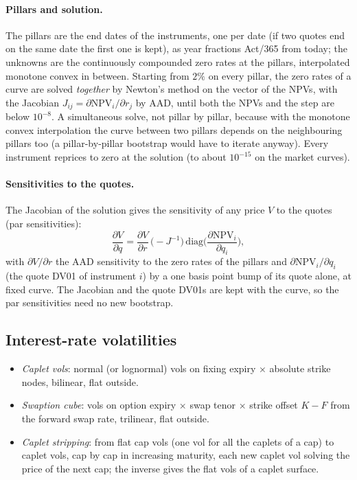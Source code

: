 \paragraph{Pillars and solution.} The pillars are the end dates of the instruments, one per date (if two quotes end on
the same date the first one is kept), as year fractions Act/365 from today; the unknowns are the continuously
compounded zero rates at the pillars, interpolated monotone convex in between. Starting from $2\%$ on every pillar,
the zero rates of a curve are solved \emph{together} by Newton's method on the vector of the NPVs, with the Jacobian
$J_{ij} = \partial \mathrm{NPV}_i/\partial r_j$ by AAD, until both the NPVs and the step are below $10^{-8}$. A simultaneous
solve, not pillar by pillar, because with the monotone convex interpolation the curve between two pillars depends on
the neighbouring pillars too (a pillar-by-pillar bootstrap would have to iterate anyway). Every instrument reprices to
zero at the solution (to about $10^{-15}$ on the market curves).

\paragraph{Sensitivities to the quotes.} The Jacobian of the solution gives the sensitivity of any price $V$ to the
quotes (par sensitivities):
\[
  \frac{\partial V}{\partial q} = \frac{\partial V}{\partial r}\,\big(-J^{-1}\big)\,
  \mathrm{diag}\Big(\frac{\partial \mathrm{NPV}_i}{\partial q_i}\Big),
\]
with $\partial V/\partial r$ the AAD sensitivity to the zero rates of the pillars and $\partial \mathrm{NPV}_i/\partial q_i$
(the quote DV01 of instrument $i$) by a one basis point bump of its quote alone, at fixed curve. The Jacobian and the
quote DV01s are kept with the curve, so the par sensitivities need no new bootstrap.

\subsection{Interest-rate volatilities}\label{sec:mp-ir-vols}
\begin{itemize}[nosep]
  \item \emph{Caplet vols}: normal (or lognormal) vols on fixing expiry $\times$ absolute strike nodes, bilinear, flat
        outside.
  \item \emph{Swaption cube}: vols on option expiry $\times$ swap tenor $\times$ strike offset $K - F$ from the forward swap rate,
        trilinear, flat outside.
  \item \emph{Caplet stripping}: from flat cap vols (one vol for all the caplets of a cap) to caplet vols, cap by cap in
        increasing maturity, each new caplet vol solving the price of the next cap; the inverse gives the flat vols of a
        caplet surface.
\end{itemize}


